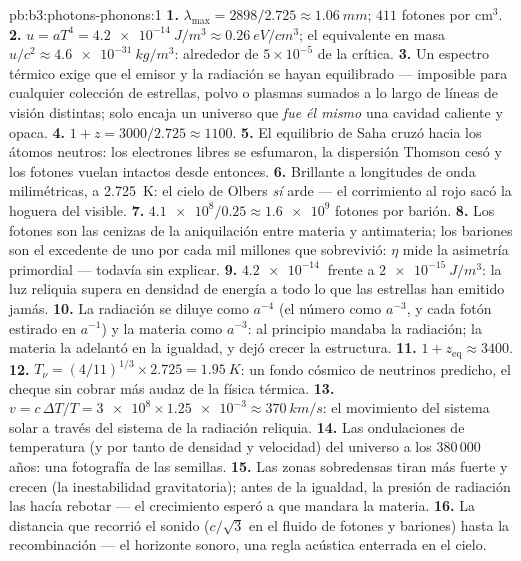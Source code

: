 \begin{solution}{pb:b3:photons-phonons:1}
\textbf{1.} $\lambda_{\max} = 2898/2.725 \approx \qty{1.06}{mm}$;
$411$ fotones por cm$^3$.
\textbf{2.} $u = aT^4 = \qty{4.2e-14}{J/m^3} \approx
\qty{0.26}{eV/cm^3}$; el equivalente en masa $u/c^2 \approx
\qty{4.6e-31}{kg/m^3}$: alrededor de $5\times10^{-5}$ de la crítica.
\textbf{3.} Un espectro térmico exige que el emisor y la radiación
se hayan equilibrado --- imposible para cualquier colección de estrellas,
polvo o plasmas sumados a lo largo de líneas de visión distintas; solo encaja un
universo que \emph{fue él mismo} una cavidad caliente y opaca.
\textbf{4.} $1 + z = 3000/2.725 \approx 1100$.
\textbf{5.} El equilibrio de Saha cruzó hacia los átomos neutros: los
electrones libres se esfumaron, la dispersión Thomson cesó y los fotones
vuelan intactos desde entonces.
\textbf{6.} Brillante a longitudes de onda milimétricas, a
\qty{2.725}{K}: el cielo de Olbers \emph{sí} arde --- el corrimiento al rojo
sacó la hoguera del visible.
\textbf{7.} $\num{4.1e8}/0.25 \approx \num{1.6e9}$ fotones por
barión.
\textbf{8.} Los fotones son las cenizas de la aniquilación entre materia y
antimateria; los bariones son el excedente de uno por cada mil millones que
sobrevivió: $\eta$ mide la asimetría primordial --- todavía
sin explicar.
\textbf{9.} $\qty{4.2e-14}{}$ frente a $\qty{2e-15}{J/m^3}$: la
luz reliquia supera en densidad de energía a todo lo que las estrellas
han emitido jamás.
\textbf{10.} La radiación se diluye como $a^{-4}$ (el número como $a^{-3}$,
y cada fotón estirado en $a^{-1}$) y la materia como $a^{-3}$: al principio
mandaba la radiación; la materia la adelantó en la igualdad, y dejó crecer
la estructura.
\textbf{11.} $1 + z_{\text{eq}} \approx 3400$.
\textbf{12.} $T_\nu = (4/11)^{1/3} \times 2.725 =
\qty{1.95}{K}$: un fondo cósmico de neutrinos predicho, el cheque sin
cobrar más audaz de la física térmica.
\textbf{13.} $v = c\,\Delta T/T = \num{3e8} \times \num{1.25e-3}
\approx \qty{370}{km/s}$: el movimiento del sistema solar a través del
sistema de la radiación reliquia.
\textbf{14.} Las ondulaciones de temperatura (y por tanto de densidad y
velocidad) del universo a los 380\,000 años: una fotografía de
las semillas.
\textbf{15.} Las zonas sobredensas tiran más fuerte y crecen (la
inestabilidad gravitatoria); antes de la igualdad, la presión de radiación
las hacía rebotar --- el crecimiento esperó a que mandara la materia.
\textbf{16.} La distancia que recorrió el sonido ($c/\sqrt3$ en el
fluido de fotones y bariones) hasta la recombinación --- el horizonte
sonoro, una regla acústica enterrada en el cielo.

\end{solution}
